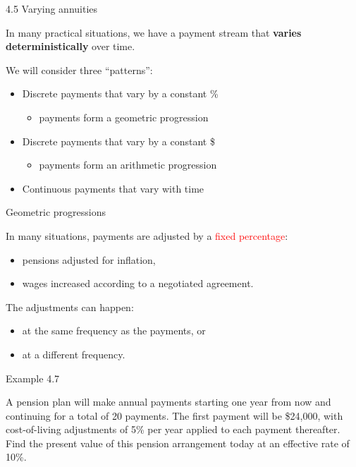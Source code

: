 \documentclass{beamer}
\begin{document}
\begin{frame}{4.5 Varying annuities}

In many practical situations, we have a payment stream that \textbf{varies deterministically} over time.

\medskip
We will consider three ``patterns'':
\begin{itemize}
\item Discrete payments that vary by a constant \%
  \begin{itemize}
  \item[$\rightarrow$] payments form a geometric progression
  \end{itemize}
\item Discrete payments that vary by a constant \$
  \begin{itemize}
  \item[$\rightarrow$] payments form an arithmetic progression
  \end{itemize}
\item Continuous payments that vary with time
\end{itemize}

\end{frame}

\begin{frame}{Geometric progressions}

In many situations, payments are adjusted by a \textcolor{red}{fixed percentage}:
\begin{itemize}
\item pensions adjusted for inflation,
\item wages increased according to a negotiated agreement.
\end{itemize}

\bigskip
The adjustments can happen:
\begin{itemize}
\item at the same frequency as the payments, or
\item at a different frequency.
\end{itemize}

\end{frame}

\begin{frame}{Example 4.7}

A pension plan will make annual payments starting one year from now and continuing for a total of 20 payments. The first payment will be \$24,000, with cost-of-living adjustments of 5\% per year applied to each payment thereafter. Find the present value of this pension arrangement today at an effective rate of 10\%.

\bigskip
\begin{center}
\end{center}

\vfill
\end{frame}
\end{document}
